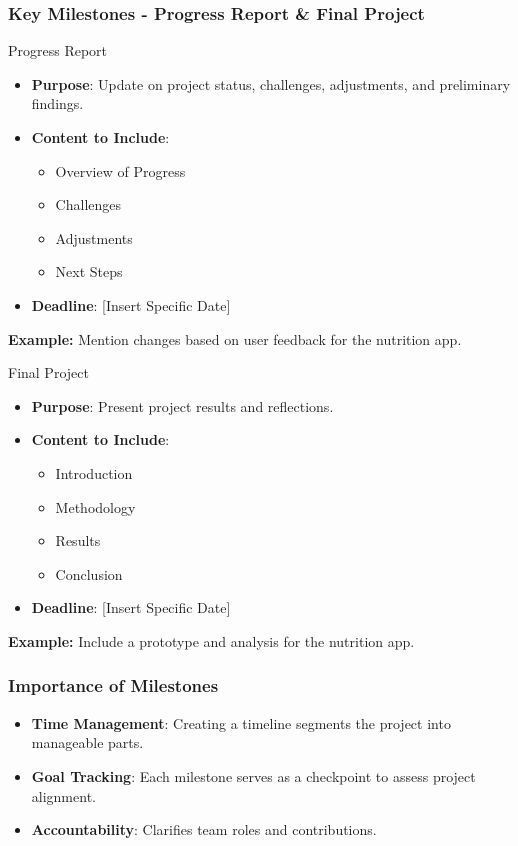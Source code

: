 \documentclass[aspectratio=169]{beamer}
\begin{document}
\begin{frame}[fragile]
  \frametitle{Key Milestones - Progress Report \& Final Project}
  \begin{block}{Progress Report}
    \begin{itemize}
      \item \textbf{Purpose}: Update on project status, challenges, adjustments, and preliminary findings.
      \item \textbf{Content to Include}:
        \begin{itemize}
          \item Overview of Progress
          \item Challenges
          \item Adjustments
          \item Next Steps
        \end{itemize}
      \item \textbf{Deadline}: [Insert Specific Date]
    \end{itemize}
    \textbf{Example:} Mention changes based on user feedback for the nutrition app.
  \end{block}
  
  \begin{block}{Final Project}
    \begin{itemize}
      \item \textbf{Purpose}: Present project results and reflections.
      \item \textbf{Content to Include}:
        \begin{itemize}
          \item Introduction
          \item Methodology
          \item Results
          \item Conclusion
        \end{itemize}
      \item \textbf{Deadline}: [Insert Specific Date]
    \end{itemize}
    \textbf{Example:} Include a prototype and analysis for the nutrition app.
  \end{block}
\end{frame}

\begin{frame}[fragile]
  \frametitle{Importance of Milestones}
  \begin{itemize}
    \item \textbf{Time Management}: Creating a timeline segments the project into manageable parts.
    \item \textbf{Goal Tracking}: Each milestone serves as a checkpoint to assess project alignment.
    \item \textbf{Accountability}: Clarifies team roles and contributions.
  \end{itemize}
\end{frame}
\end{document}
